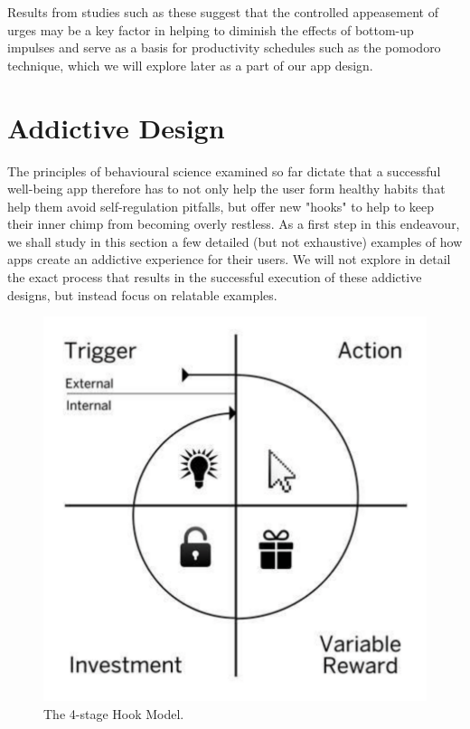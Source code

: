 Results from studies such as these suggest that the controlled appeasement of urges may be a key factor in helping to diminish the effects of bottom-up impulses and serve as a basis for productivity schedules such as the pomodoro technique, which we will explore later as a part of our app design.

\section{Addictive Design}
The principles of behavioural science examined so far dictate that a successful well-being app therefore has to not only help the user form healthy habits that help them avoid self-regulation pitfalls, but offer new "hooks" to help to keep their inner chimp from becoming overly restless. As a first step in this endeavour, we shall study in this section a few detailed (but not exhaustive) examples of how apps create an addictive experience for their users. We will not explore in detail the exact process that results in the successful execution of these addictive designs, but instead focus on relatable examples.

\begin{figure}[h]
    \begin{center}
        \includegraphics[scale=0.3]{images/hook_model.png}
    \end{center}
    \caption{The 4-stage Hook Model.}
    \label{hook_model}
\end{figure}

